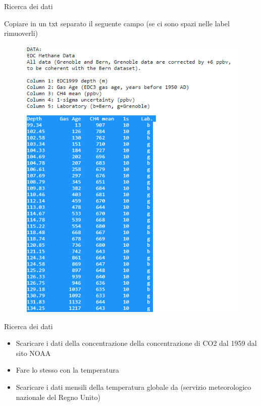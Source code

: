 \documentclass{beamer}
\begin{document}
\begin{frame}{Ricerca dei dati}
\begin{center}
Copiare in un txt separato il seguente campo (se ci sono spazi nelle label rimuoverli)
\end{center}
\begin{figure}
\begin{center}
\includegraphics[width=\textwidth ]{Pic/CH4_DATA.png}
\end{center}
\end{figure}
\end{frame}


\begin{frame}{Ricerca dei dati}
\begin{itemize}
\item Scaricare i dati della concentrazione della concentrazione di CO2 dal 1959 dal sito NOAA
 \href{https://gml.noaa.gov/webdata/ccgg/trends/co2/co2_annmean_mlo.txt}{}
 
\item Fare lo stesso con la temperatura  \href{https://www.ncdc.noaa.gov/cag/global/time-series/globe/land_ocean/1/12/1959-2021}{}

\item Scaricare i dati mensili della temperatura globale da \href{https://www.metoffice.gov.uk/hadobs/hadcrut5/data/current/analysis/diagnostics/HadCRUT.5.0.1.0.analysis.summary_series.global.monthly.csv}{} (servizio meteorologico nazionale del Regno Unito)
\end{itemize}
\end{frame}
\end{document}
